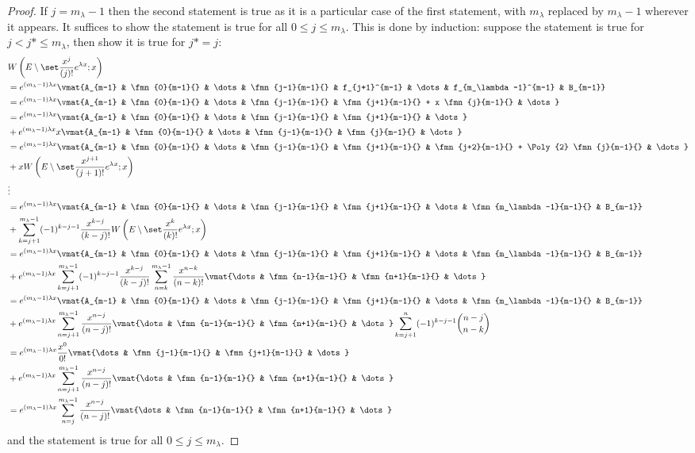 \documentclass{article}
\begin{document}
\begin{proof}
If $j = m_\lambda-1$ then the second statement is true as it is a particular case of the first statement, with $m_\lambda$ replaced by $m_\lambda-1$ wherever it appears.
It suffices to show the statement is true for all $0 \leq j \leq m_\lambda$.
This is done by induction: suppose the statement is true for $j < j* \leq m_\lambda$, then show it is true for $j* = j$:
\begin{equation*}
\begin{split}
& \Wspec{j}{} \\
& = \eone \vmat{A_{m-1} & \fmn{0}{m-1}{} & \dots & \fmn{j-1}{m-1}{} & f_{j+1}^{m-1} & \dots & f_{m_\lambda-1}^{m-1} & B_{m-1}} \\
& = \eone \vmat{A_{m-1} & \fmn{0}{m-1}{} & \dots & \fmn{j-1}{m-1}{} & \fmn{j+1}{m-1}{} + x \fmn{j}{m-1}{} & \dots} \\
& = \eone \vmat{A_{m-1} & \fmn{0}{m-1}{} & \dots & \fmn{j-1}{m-1}{} & \fmn{j+1}{m-1}{} & \dots } \\
& + \eone x \vmat{A_{m-1} & \fmn{0}{m-1}{} & \dots & \fmn{j-1}{m-1}{} & \fmn{j}{m-1}{} & \dots } \\
& = \eone \vmat{A_{m-1} & \fmn{0}{m-1}{} & \dots & \fmn{j-1}{m-1}{} & \fmn{j+1}{m-1}{} & \fmn{j+2}{m-1}{} + \Poly{2} \fmn{j}{m-1}{} & \dots } \\
& + x \Wspec{j+1}{} \\
& \vdots \\
& = \eone \vmat{A_{m-1} & \fmn{0}{m-1}{} & \dots & \fmn{j-1}{m-1}{} & \fmn{j+1}{m-1}{} & \dots & \fmn{m_\lambda-1}{m-1}{} & B_{m-1}} \\
& + \sum_{k=j+1}^{m_\lambda-1} (-1)^{k-j-1} \poly{k-j} \Wspec{k}{} \\
& = \eone \vmat{A_{m-1} & \fmn{0}{m-1}{} & \dots & \fmn{j-1}{m-1}{} & \fmn{j+1}{m-1}{} & \dots & \fmn{m_\lambda-1}{m-1}{} & B_{m-1}} \\
& + \eone \sum_{k=j+1}^{m_\lambda-1} (-1)^{k-j-1} \poly{k-j} \sum_{n=k}^{m_\lambda-1} \poly{n-k} \vmat{\dots & \fmn{n-1}{m-1}{} & \fmn{n+1}{m-1}{} & \dots} \\
& = \eone \vmat{A_{m-1} & \fmn{0}{m-1}{} & \dots & \fmn{j-1}{m-1}{} & \fmn{j+1}{m-1}{} & \dots & \fmn{m_\lambda-1}{m-1}{} & B_{m-1}} \\
& + \eone \sum_{n=j+1}^{m_\lambda-1} \poly{n-j}  \vmat{\dots & \fmn{n-1}{m-1}{} & \fmn{n+1}{m-1}{} & \dots}\sum_{k=j+1}^{n} (-1)^{k-j-1} \binom{n-j}{n-k} \\
& = \eone \Poly{0} \vmat{\dots & \fmn{j-1}{m-1}{} & \fmn{j+1}{m-1}{} & \dots} \\
& + \eone \sum_{n=j+1}^{m_\lambda-1} \poly{n-j}  \vmat{\dots & \fmn{n-1}{m-1}{} & \fmn{n+1}{m-1}{} & \dots} \\
& = \eone \sum_{n=j}^{m_\lambda-1} \poly{n-j} \vmat{\dots & \fmn{n-1}{m-1}{} & \fmn{n+1}{m-1}{} & \dots}
\end{split}
\end{equation*}
and the statement is true for all $0 \leq j \leq m_\lambda$.
\end{proof}
\end{document}
